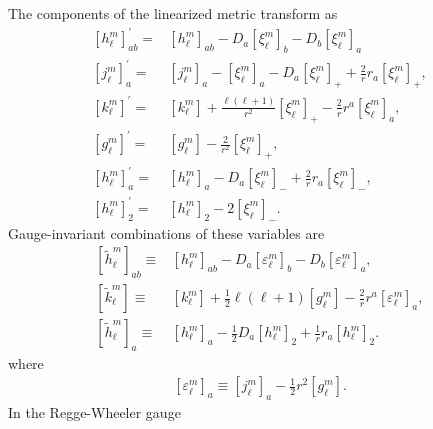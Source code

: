 \documentclass[12pt]{report}
\begin{document}
The components of the linearized metric transform as 
\begin{subequations}
\begin{align}
    \left[h^m_{\ell}\right]^{\prime}_{ab}
    =&
    \left[h^m_{\ell}\right]_{ab}
    -
    D_a\left[\xi^m_{\ell}\right]_b
    -
    D_b\left[\xi^m_{\ell}\right]_a
    \\
    \left[j^m_{\ell}\right]^{\prime}_a
    =&
    \left[j^m_{\ell}\right]_a
    -
    \left[\xi^m_{\ell}\right]_a
    -
    D_a\left[\xi^m_{\ell}\right]_+
    +
    \frac{2}{r}r_a\left[\xi^m_{\ell}\right]_+
    ,\\
    \left[k^m_{\ell}\right]^{\prime}
    =&
    \left[k^m_{\ell}\right]
    +
    \frac{\ell\left(\ell+1\right)}{r^2}\left[\xi^m_{\ell}\right]_+
    -
    \frac{2}{r}r^a\left[\xi^m_{\ell}\right]_a
    ,\\
    \left[g^m_{\ell}\right]^{\prime}
    =&
    \left[g^m_{\ell}\right]
    -
    \frac{2}{r^2}\left[\xi^m_{\ell}\right]_+
    ,\\
    \left[h^m_{\ell}\right]_a^{\prime}
    =&
    \left[h^m_{\ell}\right]_a
    -
    D_a\left[\xi^m_{\ell}\right]_-
    +
    \frac{2}{r}r_a\left[\xi^m_{\ell}\right]_-
    ,\\
    \left[h^m_{\ell}\right]^{\prime}_2
    =&
    \left[h^m_{\ell}\right]_2
    -
    2\left[\xi^m_{\ell}\right]_-
    .
\end{align}
\end{subequations}
Gauge-invariant combinations of these variables are
\begin{align}
    \left[\tilde{h}^m_{\ell}\right]_{ab}
    \equiv&
    \left[h^m_{\ell}\right]_{ab}
    -
    D_a\left[\varepsilon^m_{\ell}\right]_b
    -
    D_b\left[\varepsilon^m_{\ell}\right]_a
    ,\\
    \left[\tilde{k}^m_{\ell}\right]
    \equiv&
    \left[k^m_{\ell}\right]
    +
    \frac{1}{2}\ell\left(\ell+1\right)\left[g^m_{\ell}\right]
    -
    \frac{2}{r}r^a\left[\varepsilon^m_{\ell}\right]_a
    ,\\
    \left[\tilde{h}^m_{\ell}\right]_a
    \equiv&
    \left[h^m_{\ell}\right]_a
    -
    \frac{1}{2}D_a\left[h^m_{\ell}\right]_2
    +
    \frac{1}{r}r_a\left[h^m_{\ell}\right]_2
    .
\end{align}
where
\begin{align}
    \left[\varepsilon^m_{\ell}\right]_a
    \equiv
    \left[j^m_{\ell}\right]_a
    -
    \frac{1}{2}r^2\left[g^m_{\ell}\right]
    .
\end{align}
In the Regge-Wheeler gauge \cite{Regge:1957td,1967ApJ...149..591T}
\end{document}
